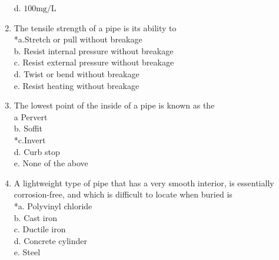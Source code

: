 \begin{enumerate}[1.]
d. $100 \mathrm{mg} / \mathrm{L}$\\
\item The tensile strength of a pipe is its ability to\\
*a.Stretch or pull without breakage\\
b. Resist internal pressure without breakage\\
c. Resist external pressure without breakage\\
d. Twist or bend without breakage\\
e. Resist heating without breakage\\
\item The lowest point of the inside of a pipe is known as the\\
a Pervert\\
b. Soffit\\
*c.Invert\\
d. Curb stop\\
e. None of the above\\
\item A lightweight type of pipe that has a very smooth interior, is essentially corrosion-free, and which is difficult to locate when buried is\\
*a. Polyvinyl chloride\\
b. Cast iron\\
c. Ductile iron\\
d. Concrete cylinder\\
e. Steel\\


\end{enumerate}


\newpage
